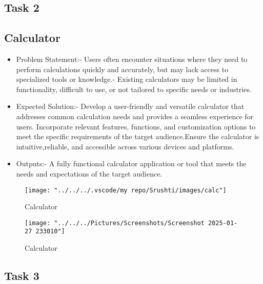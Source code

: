 \subsection*{Task 2}
\subsection*{Calculator}
\begin{itemize}
\item Problem Statement:- Users often encounter situations where they need to perform calculations quickly and accurately, but may lack access to specialized tools
or knowledge.- Existing calculators may be limited in functionality, difficult to use, or not tailored to specific needs or industries.
\item  Expected Solution:- Develop a user-friendly and versatile calculator that addresses common calculation needs and provides a seamless experience for users. Incorporate relevant features, functions, and customization options to meet the specific requirements of the target audience.Ensure the calculator is intuitive,reliable, and accessible across various devices and platforms.
\item Outputs:- A fully functional calculator application or tool that meets the needs and expectations of the target audience.
\end{itemize}
\newpage
\begin{figure}[tbph]
\centering
\texttt{[image: "../../../.vscode/my repo/Srushti/images/calc"]}
\caption{Calculator}
\label{fig:calc}
\end{figure}
\begin{figure}[tbph]
\centering
\hspace{-5mm}
\vspace{-10mm}
\texttt{[image: "../../../Pictures/Screenshots/Screenshot 2025-01-27 233010"]}
\caption{Calculator}
\label{fig:screenshot-2025-01-27-233010}
\end{figure}
\subsection*{Task 3}
